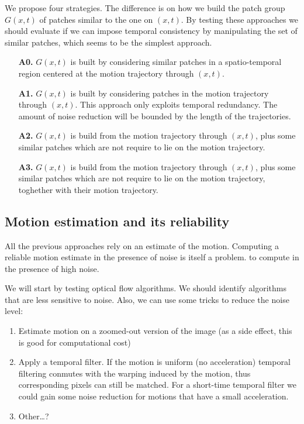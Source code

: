 \documentclass[a4paper,10pt]{article}
\begin{document}
We propose four strategies. The difference is on how we build the patch 
group $G(x,t)$ of patches similar to the one on $(x,t)$.
By testing these approaches we should evaluate if we can impose temporal 
consistency by manipulating the set of similar patches, which seems to 
be the simplest approach. 
\begin{enumerate}
	\item[\textbf{A0.}] $G(x,t)$ is built by considering similar
		patches in a spatio-temporal region centered at the motion
		trajectory through $(x,t)$. 
	\item[\textbf{A1.}] $G(x,t)$ is built by considering patches in the motion trajectory
		through $(x,t)$. This approach only exploits temporal redundancy. The amount
		of noise reduction will be bounded by the length of the trajectories.
	\item[\textbf{A2.}] $G(x,t)$ is build from the motion trajectory through $(x,t)$,
		plus some similar patches which are not require to lie on the motion
		trajectory.
	\item[\textbf{A3.}] $G(x,t)$ is build from the motion trajectory through $(x,t)$,
		plus some similar patches which are not require to lie on the motion
		trajectory, toghether with their motion trajectory.
\end{enumerate}

\bigskip

\bigskip


\subsection*{Motion estimation and its reliability}

All the previous approaches rely on an estimate of the motion. Computing a 
reliable motion estimate in the presence of noise is itself a problem.
to compute in the presence of high noise.

We will start by testing optical flow algorithms. We should identify 
algorithms that are less sensitive to noise. Also, we can use some tricks
to reduce the noise level:
\begin{enumerate}
	\item Estimate motion on a zoomed-out version of the image (as a side
		effect, this is good for computational cost)
	\item Apply a temporal filter. If the motion is uniform (no acceleration)
		temporal filtering conmutes with the warping induced by the motion, thus
		corresponding pixels can still be matched. For a short-time temporal
		filter we could gain some noise reduction for motions that have a small
		acceleration. 
	\item Other\dots ?
\end{enumerate}
\end{document}
